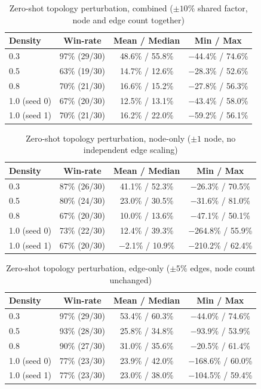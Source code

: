 \begin{table}[h]
\centering
\caption{Zero-shot topology perturbation, combined ($\pm10\%$ shared factor, node and edge count together)}
\label{tab:topology-combined}
\begin{tabular}{lccc}
\toprule
Density & Win-rate & Mean / Median & Min / Max \\
\midrule
0.3          & 97\% (29/30) & 48.6\% / 55.8\% & $-$44.4\% / 74.6\% \\
0.5          & 63\% (19/30) & 14.7\% / 12.6\% & $-$28.3\% / 52.6\% \\
0.8          & 70\% (21/30) & 16.6\% / 15.2\% & $-$27.8\% / 56.3\% \\
1.0 (seed 0) & 67\% (20/30) & 12.5\% / 13.1\% & $-$43.4\% / 58.0\% \\
1.0 (seed 1) & 70\% (21/30) & 16.2\% / 22.0\% & $-$59.2\% / 56.1\% \\
\bottomrule
\end{tabular}
\end{table}


\begin{table}[h]
\centering
\caption{Zero-shot topology perturbation, node-only ($\pm1$ node, no independent edge scaling)}
\label{tab:topology-node}
\begin{tabular}{lccc}
\toprule
Density & Win-rate & Mean / Median & Min / Max \\
\midrule
0.3          & 87\% (26/30) & 41.1\% / 52.3\% & $-$26.3\% / 70.5\% \\
0.5          & 80\% (24/30) & 23.0\% / 30.5\% & $-$31.6\% / 81.0\% \\
0.8          & 67\% (20/30) & 10.0\% / 13.6\% & $-$47.1\% / 50.1\% \\
1.0 (seed 0) & 73\% (22/30) & 12.4\% / 39.3\% & $-$264.8\% / 55.9\% \\
1.0 (seed 1) & 67\% (20/30) & $-$2.1\% / 10.9\% & $-$210.2\% / 62.4\% \\
\bottomrule
\end{tabular}
\end{table}


\begin{table}[h]
\centering
\caption{Zero-shot topology perturbation, edge-only ($\pm5\%$ edges, node count unchanged)}
\label{tab:topology-edge}
\begin{tabular}{lccc}
\toprule
Density & Win-rate & Mean / Median & Min / Max \\
\midrule
0.3          & 97\% (29/30) & 53.4\% / 60.3\% & $-$44.0\% / 74.6\% \\
0.5          & 93\% (28/30) & 25.8\% / 34.8\% & $-$93.9\% / 53.9\% \\
0.8          & 90\% (27/30) & 31.0\% / 35.6\% & $-$20.5\% / 61.4\% \\
1.0 (seed 0) & 77\% (23/30) & 23.9\% / 42.0\% & $-$168.6\% / 60.0\% \\
1.0 (seed 1) & 77\% (23/30) & 23.0\% / 38.0\% & $-$104.5\% / 59.4\% \\
\bottomrule
\end{tabular}
\end{table}
